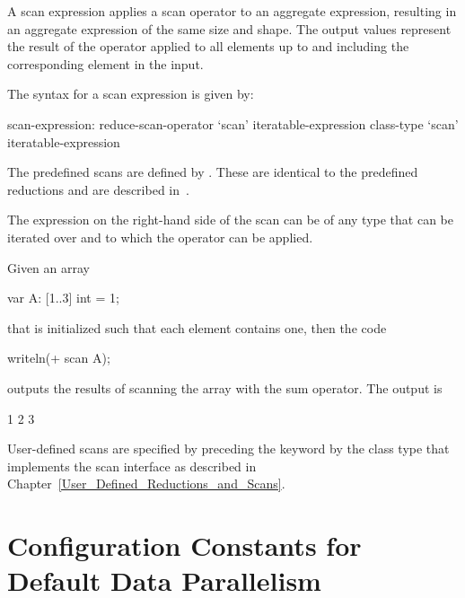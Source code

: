 A scan expression applies a scan operator to an aggregate expression,
resulting in an aggregate expression of the same size and shape.  The
output values represent the result of the operator applied to all
elements up to and including the corresponding element in the input.

The syntax for a scan expression is given by:
\begin{syntax}
scan-expression:
  reduce-scan-operator `scan' iteratable-expression
  class-type `scan' iteratable-expression
\end{syntax}

The predefined scans are defined by .  These
are identical to the predefined reductions and are described
in~.

The expression on the right-hand side of the scan can be of any type
that can be iterated over and to which the operator can be applied.

%
%
\begin{example}
Given an array
\begin{chapel}
var A: [1..3] int = 1;
\end{chapel}
that is initialized such that each element contains one, then the code
\begin{chapel}
writeln(+ scan A);
\end{chapel}
outputs the results of scanning the array with the sum operator.  The
output is
\begin{chapelprintoutput}{}
1 2 3
\end{chapelprintoutput}
\end{example}

User-defined scans are specified by preceding the keyword 
by the class type that implements the scan interface as described
in Chapter~\ref{User_Defined_Reductions_and_Scans}.

\section{Configuration Constants for Default Data Parallelism}
\label{data_parallel_knobs}

